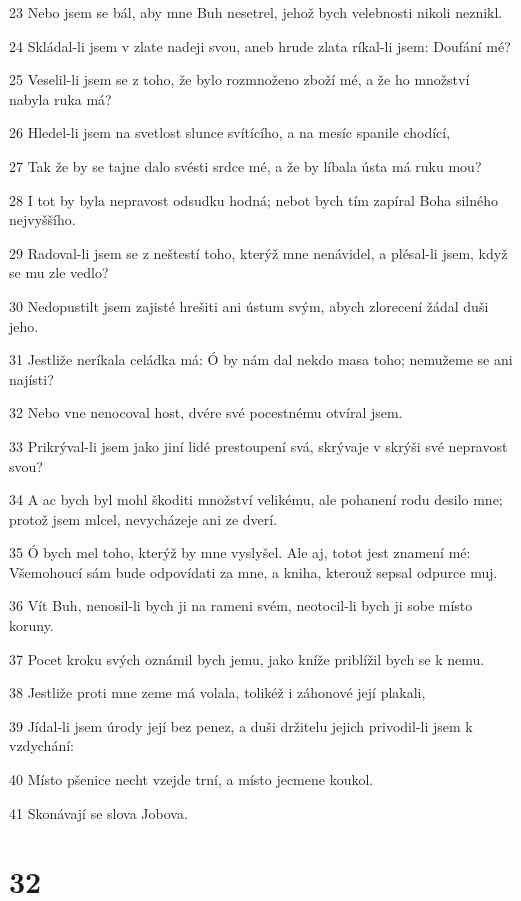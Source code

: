 \par 23 Nebo jsem se bál, aby mne Buh nesetrel, jehož bych velebnosti nikoli neznikl.
\par 24 Skládal-li jsem v zlate nadeji svou, aneb hrude zlata ríkal-li jsem: Doufání mé?
\par 25 Veselil-li jsem se z toho, že bylo rozmnoženo zboží mé, a že ho množství nabyla ruka má?
\par 26 Hledel-li jsem na svetlost slunce svítícího, a na mesíc spanile chodící,
\par 27 Tak že by se tajne dalo svésti srdce mé, a že by líbala ústa má ruku mou?
\par 28 I tot by byla nepravost odsudku hodná; nebot bych tím zapíral Boha silného nejvyššího.
\par 29 Radoval-li jsem se z neštestí toho, kterýž mne nenávidel, a plésal-li jsem, když se mu zle vedlo?
\par 30 Nedopustilt jsem zajisté hrešiti ani ústum svým, abych zlorecení žádal duši jeho.
\par 31 Jestliže neríkala celádka má: Ó by nám dal nekdo masa toho; nemužeme se ani najísti?
\par 32 Nebo vne nenocoval host, dvére své pocestnému otvíral jsem.
\par 33 Prikrýval-li jsem jako jiní lidé prestoupení svá, skrývaje v skrýši své nepravost svou?
\par 34 A ac bych byl mohl škoditi množství velikému, ale pohanení rodu desilo mne; protož jsem mlcel, nevycházeje ani ze dverí.
\par 35 Ó bych mel toho, kterýž by mne vyslyšel. Ale aj, totot jest znamení mé: Všemohoucí sám bude odpovídati za mne, a kniha, kterouž sepsal odpurce muj.
\par 36 Vít Buh, nenosil-li bych ji na rameni svém, neotocil-li bych ji sobe místo koruny.
\par 37 Pocet kroku svých oznámil bych jemu, jako kníže priblížil bych se k nemu.
\par 38 Jestliže proti mne zeme má volala, tolikéž i záhonové její plakali,
\par 39 Jídal-li jsem úrody její bez penez, a duši držitelu jejich privodil-li jsem k vzdychání:
\par 40 Místo pšenice necht vzejde trní, a místo jecmene koukol.
\par 41 Skonávají se slova Jobova.

\chapter{32}


